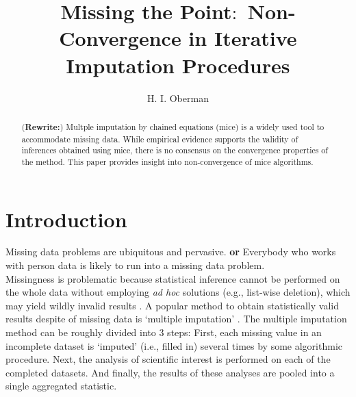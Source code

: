 \documentclass[Royal,times,sageh]{sagej}
\begin{document}
\title{Missing the Point\(\colon\) Non-Convergence in Iterative Imputation
Procedures}


\author{H. I. Oberman}




\begin{abstract}
(\textbf{Rewrite:}) Multple imputation by chained equations (mice) is a
widely used tool to accommodate missing data. While empirical evidence
supports the validity of inferences obtained using mice, there is no
consensus on the convergence properties of the method. This paper
provides insight into non-convergence of mice algorithms.
\end{abstract}


\maketitle

\hypertarget{introduction}{%
\section{Introduction}\label{introduction}}

Missing data problems are ubiquitous and pervasive. \textbf{or}
Everybody who works with person data is likely to run into a missing
data problem.\\
Missingness is problematic because statistical inference cannot be
performed on the whole data without employing \emph{ad hoc} solutions
(e.g., list-wise deletion), which may yield wildly invalid results
\citep{buur18}. A popular method to obtain statistically valid results
despite of missing data is `multiple imputation' \citep[MI;][]{rubin76}.
The multiple imputation method can be roughly divided into 3 steps:
First, each missing value in an incomplete dataset is `imputed' (i.e.,
filled in) several times by some algorithmic procedure. Next, the
analysis of scientific interest is performed on each of the completed
datasets. And finally, the results of these analyses are pooled into a
single aggregated statistic.
\end{document}

